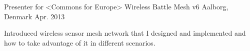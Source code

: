 

\begin{cventries}

  \cventry
    {Presenter for <Commons for Europe>} %
    {Wireless Battle Mesh v6} %
    {Aalborg, Denmark} %
    {Apr. 2013} %
    {
      \begin{cvitems} %
        \item {Introduced wireless sensor mesh network that I designed and implemented and how to take advantage of it in different scenarios.}
      \end{cvitems}
    }

\end{cventries}
